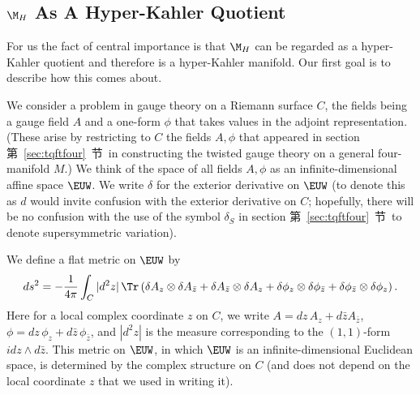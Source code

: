 
\subsection{$\M_H$ As A Hyper-Kahler Quotient}

\label{sec:mhhyper}

For us the fact of central importance is that $\M_H$ can be
regarded as a hyper-Kahler quotient and therefore is a
hyper-Kahler manifold. Our first goal is to describe how this
comes about.

We consider a problem in gauge theory on a Riemann surface $C$,
the fields being a gauge field $ A$ and a one-form $\phi$ that
takes values in the adjoint representation.  (These arise by
restricting to $C$ the fields $A,\phi$ that appeared in section
第~\ref{sec:tqftfour}~节\ in constructing the twisted gauge theory on a general
four-manifold $M$.)  We think of the space of all fields $A,\phi$
as an infinite-dimensional affine space $\EUW$.  We write $\delta$
for the exterior derivative on $\EUW$ (to denote this as $d$ would
invite confusion with the exterior derivative on $C$; hopefully,
there will be no confusion with the use of the symbol $\delta_S$
in section 第~\ref{sec:tqftfour}~节\ to denote supersymmetric variation).

We define a flat metric on $\EUW$ by %
\setcounter{equation}{1}
\begin{equation}\label{eq:igob}
ds^2=-{1\over
4\pi}\int_C|d^2z|\,\Tr\left(\delta A_z\otimes \delta A_{\bar
z}+\delta A_{\bar z}\otimes \delta A_z +\delta \phi_z\otimes
\delta \phi_{\bar z}+\delta \phi_{\bar z}\otimes \delta
\phi_z\right).
\end{equation}
 Here for a local complex coordinate $z$ on $C$, we
write $A=dz\,A_z+d\bar z A_{\bar z}$, $\phi = dz\,\phi_z+d\bar
z\,\phi_{\bar z}$, and $|d^2z|$ is the measure corresponding to
the $(1,1)$-form $i dz\wedge d\bar z$.  This metric on $\EUW$, in
which $\EUW$ is an infinite-dimensional Euclidean space, is
determined by the complex structure on $C$ (and does not depend on
the local coordinate $z$ that we used in writing it).

